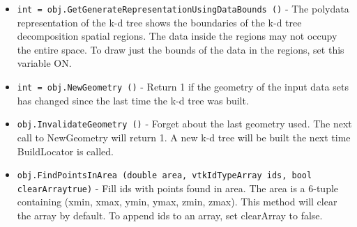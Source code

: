 \begin{itemize}
\item  \verb|int = obj.GetGenerateRepresentationUsingDataBounds ()| -     The polydata representation of the k-d tree shows the boundaries
    of the k-d tree decomposition spatial regions.  The data inside
    the regions may not occupy the entire space.  To draw just the
    bounds of the data in the regions, set this variable ON.

\item  \verb|int = obj.NewGeometry ()| -     Return 1 if the geometry of the input data sets
    has changed since the last time the k-d tree was built.

\item  \verb|obj.InvalidateGeometry ()| -  Forget about the last geometry used.  The next call to NewGeometry will
 return 1.  A new k-d tree will be built the next time BuildLocator is
 called.

\item  \verb|obj.FindPointsInArea (double area, vtkIdTypeArray ids, bool clearArraytrue)| -  Fill ids with points found in area.  The area is a 6-tuple containing
 (xmin, xmax, ymin, ymax, zmin, zmax).
 This method will clear the array by default.  To append ids to an array,
 set clearArray to false.

\end{itemize}
